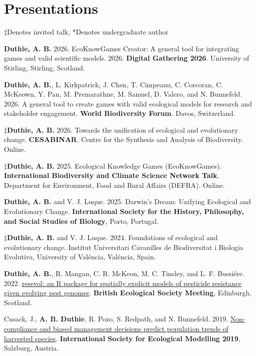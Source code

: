 \documentclass[letterpaper]{article}
\renewenvironment{itemize}{
  \begin{list}{}{
    \setlength{\leftmargin}{1.5em}
  }
}{
  \end{list}
}
\begin{document}
\section*{Presentations}
\begin{itemize}
\item $\ddagger$Denotes invited talk, *Denotes undergraduate author
\item {\bf Duthie, A. B.} 2026. EcoKnowGames Creator: A general tool for integrating games and valid scientific models. 2026. {\bf Digital Gathering 2026}. University of Stirling, Stirling, Scotland.
\item {\bf Duthie, A. B.}, L. Kirkpatrick, J. Chen, T. Cimpeanu, C. Corcoran, C. McKeown, Y. Pan, M. Premarathne, M. Samuel, D. Valero, and N. Bunnefeld. 2026. A general tool to create games with valid ecological models for research and stakeholder engagement. {\bf World Biodiversity Forum}. Davos, Switzerland.
\item $\ddagger${\bf Duthie, A. B.} 2026. Towards the unification of ecological and evolutionary change. {\bf CESABINAR}. Centre for the Synthesis and Analysis of Biodiversity. Online.
\item $\ddagger${\bf Duthie, A. B.} 2025. Ecological Knowledge Games (EcoKnowGames). {\bf International Biodiversity and Climate Science Network Talk}. Department for Environment, Food and Rural Affairs (DEFRA). Online.
\item {\bf Duthie, A. B.} and V. J. Luque. 2025. Darwin's Dream: Unifying Ecological and Evolutionary Change. {\bf International Society for the History, Philosophy, and Social Studies of Biology}, Porto, Portugal.
\item $\ddagger${\bf Duthie, A. B.} and V. J. Luque. 2024. Foundations of ecological and evolutionary change. Institut Universitari Cavanilles de Biodiversitat i Biologia Evolutiva, University of Val\'{e}ncia, Val\'{e}ncia, Spain.
\item {\bf Duthie, A. B.}, R. Mangan, C. R. McKeon, M. C. Tinsley, and L. F. Bussi\'{e}re. 2022. \href{http://bradduthie.github.io/talks/BES2022.pdf}{resevol: an R package for spatially explicit models of pesticide resistance given evolving pest genomes}. {\bf British Ecological Society Meeting}, Edinburgh, Scotland.
\item Cusack, J., {\bf A. B. Duthie}, R. Pozo, S. Redpath, and N. Bunnefeld. 2019. \href{http://bradduthie.github.io/talks/duthie_ISEM_2019.pdf}{Non-compliance and biased management decisions predict population trends of harvested species}. {\bf International Society for Ecological Modelling 2019}, Salzburg, Austria.

\end{itemize}
\end{document}
